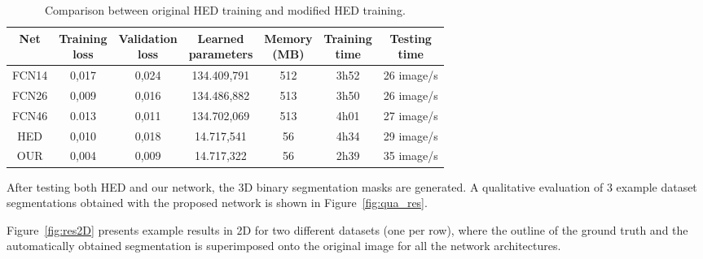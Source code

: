 \documentclass[preprint,authoryear,12pt]{elsarticle}
\begin{document}
\begin{table}[htb]
\centering
\begin{tabular}{c|c|c|c|c|c|c}
\hline
Net  &  \thead{Training \\ loss} &  \thead{Validation \\ loss} & \thead{Learned \\ parameters} & \thead{Memory \\ (MB)} & \thead{Training \\ time} & \thead{Testing \\ time} \\
\hline 
FCN14 & 0,017 & 0,024 & 134.409,791 & 512 & 3h52 & 26 image/s\\
FCN26 & 0,009 & 0,016 & 134.486,882 & 513 & 3h50 & 26 image/s\\
FCN46 & 0.013 & 0,011 & 134.702,069 & 513 & 4h01 & 27 image/s\\
HED  & 0,010 & 0,018  & 14.717,541 & 56 & 4h34 & 29 image/s\\
OUR & 0,004  & 0,009 & 14.717,322 & 56 & 2h39 & 35 image/s
\end{tabular}
\caption{\label{tab:Comptraining}Comparison between original HED training and modified HED training.}
\end{table}


After testing both HED and our network, the 3D binary segmentation masks are generated. A qualitative evaluation of 3 example dataset segmentations obtained with the proposed network is shown in Figure~\ref{fig:qua_res}.%

Figure~\ref{fig:res2D} presents example results in 2D for two different datasets (one per row), where the outline of the ground truth and the automatically obtained segmentation is superimposed onto the original image for all the network architectures.  \par
\end{document}

